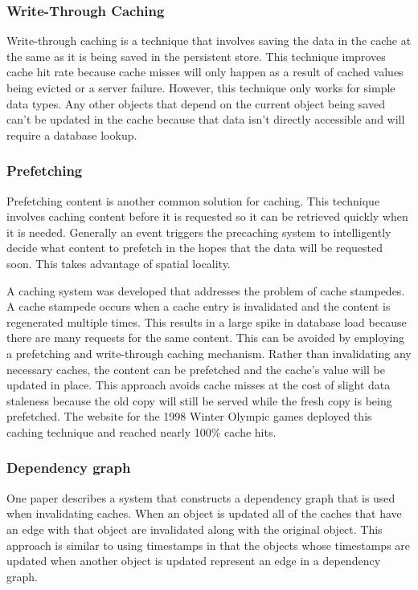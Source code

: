 \documentclass[12pt]{article}
\begin{document}
\subsubsection{Write-Through Caching}
Write-through caching is a technique that involves saving the data in the cache at the same as it is being saved in the persistent store.\cite{writeThroughCaching}
This technique improves cache hit rate because cache misses will only happen as a result of cached values being evicted or a server failure.
However, this technique only works for simple data types.
Any other objects that depend on the current object being saved can't be updated in the cache because that data isn't directly accessible and will require a database lookup.

\subsubsection{Prefetching}
Prefetching content is another common solution for caching.
This technique involves caching content before it is requested so it can be retrieved quickly when it is needed.
Generally an event triggers the precaching system to intelligently decide what content to prefetch in the hopes that the data will be requested soon.
This takes advantage of spatial locality.

A caching system was developed that addresses the problem of cache stampedes.\cite{scalableConsistentCaching}
A cache stampede occurs when a cache entry is invalidated and the content is regenerated multiple times.
This results in a large spike in database load because there are many requests for the same content.
This can be avoided by employing a prefetching and write-through caching mechanism.
Rather than invalidating any necessary caches, the content can be prefetched and the cache's value will be updated in place.
This approach avoids cache misses at the cost of slight data staleness because the old copy will still be served while the fresh copy is being prefetched.
The website for the 1998 Winter Olympic games deployed this caching technique and reached nearly 100\% cache hits.\cite{scalableConsistentCaching}

\subsubsection{Dependency graph}
One paper describes a system that constructs a dependency graph that is used when invalidating caches.\cite{scalableConsistentCaching}
When an object is updated all of the caches that have an edge with that object are invalidated along with the original object.
This approach is similar to using timestamps in that the objects whose timestamps are updated when another object is updated represent an edge in a dependency graph.
\end{document}

